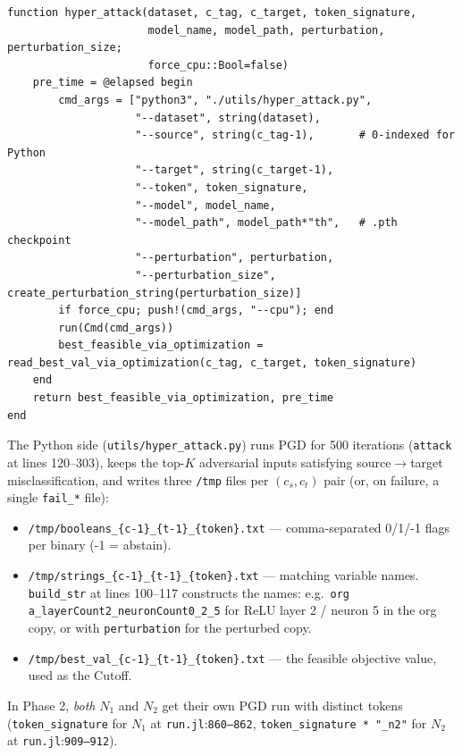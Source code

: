 \documentclass[11pt]{article}
\newcommand{\src}[1]{\texttt{\small #1}}
\newcommand{\fileline}[2]{\src{#1}:\src{#2}}
\begin{document}
\begin{lstlisting}[style=jl]
function hyper_attack(dataset, c_tag, c_target, token_signature,
                      model_name, model_path, perturbation, perturbation_size;
                      force_cpu::Bool=false)
    pre_time = @elapsed begin
        cmd_args = ["python3", "./utils/hyper_attack.py",
                    "--dataset", string(dataset),
                    "--source", string(c_tag-1),       # 0-indexed for Python
                    "--target", string(c_target-1),
                    "--token", token_signature,
                    "--model", model_name,
                    "--model_path", model_path*"th",   # .pth checkpoint
                    "--perturbation", perturbation,
                    "--perturbation_size", create_perturbation_string(perturbation_size)]
        if force_cpu; push!(cmd_args, "--cpu"); end
        run(Cmd(cmd_args))
        best_feasible_via_optimization = read_best_val_via_optimization(c_tag, c_target, token_signature)
    end
    return best_feasible_via_optimization, pre_time
end
\end{lstlisting}

The Python side (\src{utils/hyper\_attack.py}) runs PGD for 500
iterations (\src{attack} at lines 120--303), keeps the top-$K$
adversarial inputs satisfying source$\to$target misclassification,
and writes three \src{/tmp} files per $(c_s, c_t)$ pair (or, on
failure, a single \src{fail\_*} file):

\begin{itemize}[noitemsep]
  \item \src{/tmp/booleans\_\{c-1\}\_\{t-1\}\_\{token\}.txt} ---
    comma-separated 0/1/-1 flags per binary (-1 = abstain).
  \item \src{/tmp/strings\_\{c-1\}\_\{t-1\}\_\{token\}.txt} ---
    matching variable names. \src{build\_str} at lines 100--117
    constructs the names: e.g.\
    \src{org a\_layerCount2\_neuronCount0\_2\_5}
    for ReLU layer 2 / neuron 5 in the org copy, or with
    \src{perturbation} for the perturbed copy.
  \item \src{/tmp/best\_val\_\{c-1\}\_\{t-1\}\_\{token\}.txt} ---
    the feasible objective value, used as the Cutoff.
\end{itemize}

In Phase 2, \emph{both} $N_1$ and $N_2$ get their own PGD run with
distinct tokens (\src{token\_signature} for $N_1$ at
\fileline{run.jl}{860--862}, \src{token\_signature * "\_n2"} for
$N_2$ at \fileline{run.jl}{909--912}).
\end{document}

